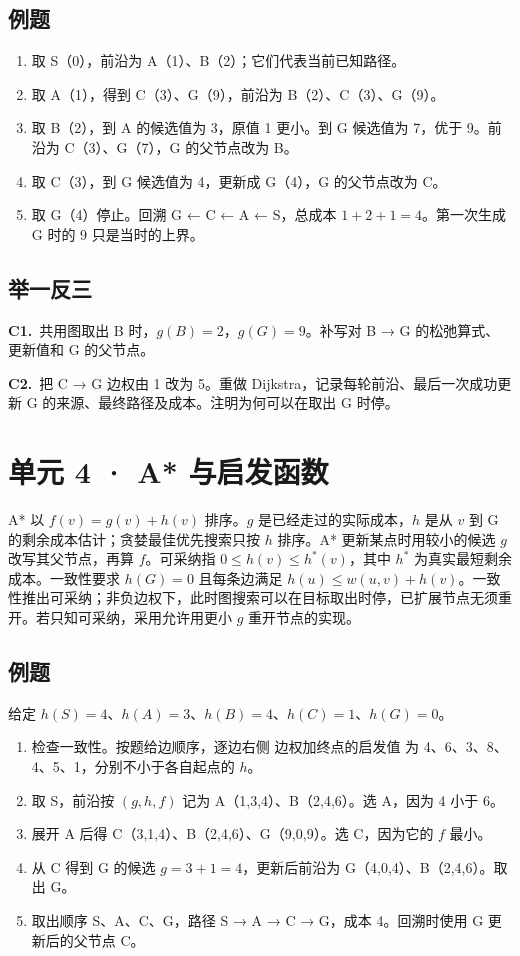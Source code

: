 \documentclass[UTF8,a4paper,11pt]{ctexart}
\newcommand{\CompactQuestion}[2]{\par\noindent\textbf{#1.}\ #2\par\vspace{.8em}}
\begin{document}
\subsection{例题}
\begin{enumerate}
\item 取 S（0），前沿为 A（1）、B（2）；它们代表当前已知路径。
\item 取 A（1），得到 C（3）、G（9），前沿为 B（2）、C（3）、G（9）。
\item 取 B（2），到 A 的候选值为 3，原值 1 更小。到 G 候选值为 7，优于 9。前沿为 C（3）、G（7），G 的父节点改为 B。
\item 取 C（3），到 G 候选值为 4，更新成 G（4），G 的父节点改为 C。
\item 取 G（4）停止。回溯 G ← C ← A ← S，总成本 $1+2+1=4$。第一次生成 G 时的 9 只是当时的上界。
\end{enumerate}
\subsection{举一反三}
\CompactQuestion{C1}{共用图取出 B 时，$g(B)=2$，$g(G)=9$。补写对 B → G 的松弛算式、更新值和 G 的父节点。}
\CompactQuestion{C2}{把 C → G 边权由 1 改为 5。重做 Dijkstra，记录每轮前沿、最后一次成功更新 G 的来源、最终路径及成本。注明为何可以在取出 G 时停。}
\clearpage
\section{单元 4 · A* 与启发函数}
A* 以 $f(v)=g(v)+h(v)$ 排序。$g$ 是已经走过的实际成本，$h$ 是从 $v$ 到 G 的剩余成本估计；贪婪最佳优先搜索只按 $h$ 排序。A* 更新某点时用较小的候选 $g$ 改写其父节点，再算 $f$。可采纳指 $0\le h(v)\le h^*(v)$，其中 $h^*$ 为真实最短剩余成本。一致性要求 $h(G)=0$ 且每条边满足 $h(u)\le w(u,v)+h(v)$。一致性推出可采纳；非负边权下，此时图搜索可以在目标取出时停，已扩展节点无须重开。若只知可采纳，采用允许用更小 $g$ 重开节点的实现。

\subsection{例题}
给定 $h(S)=4$、$h(A)=3$、$h(B)=4$、$h(C)=1$、$h(G)=0$。

\begin{enumerate}
\item 检查一致性。按题给边顺序，逐边右侧 边权加终点的启发值 为 4、6、3、8、4、5、1，分别不小于各自起点的 $h$。
\item 取 S，前沿按 $(g,h,f)$ 记为 A（1,3,4）、B（2,4,6）。选 A，因为 4 小于 6。
\item 展开 A 后得 C（3,1,4）、B（2,4,6）、G（9,0,9）。选 C，因为它的 $f$ 最小。
\item 从 C 得到 G 的候选 $g=3+1=4$，更新后前沿为 G（4,0,4）、B（2,4,6）。取出 G。
\item 取出顺序 S、A、C、G，路径 S → A → C → G，成本 4。回溯时使用 G 更新后的父节点 C。
\end{enumerate}
\end{document}
